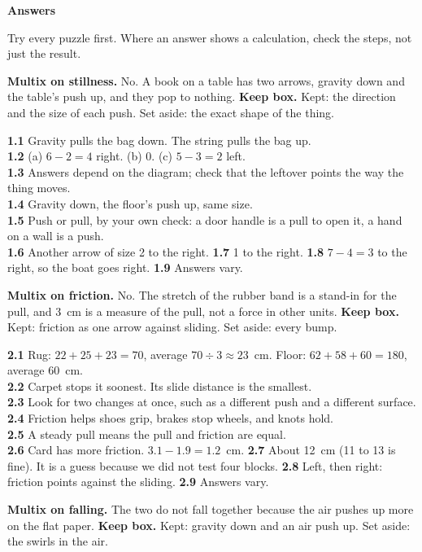 \clearpage\label{answers}
{\sans\bfseries\LARGE\color{ink} Answers}\par
\footnotesize
Try every puzzle first. Where an answer shows a calculation, check the steps, not just the result.

\textbf{Multix on stillness.} No. A book on a table has two arrows, gravity down and the table's push up, and they pop to nothing. \textbf{Keep box.} Kept: the direction and the size of each push. Set aside: the exact shape of the thing.

\textbf{1.1} Gravity pulls the bag down. The string pulls the bag up.\\
\textbf{1.2} (a) $6-2=4$ right. (b) 0. (c) $5-3=2$ left.\\
\textbf{1.3} Answers depend on the diagram; check that the leftover points the way the thing moves.\\
\textbf{1.4} Gravity down, the floor's push up, same size.\\
\textbf{1.5} Push or pull, by your own check: a door handle is a pull to open it, a hand on a wall is a push.\\
\textbf{1.6} Another arrow of size 2 to the right. \textbf{1.7} 1 to the right. \textbf{1.8} $7-4=3$ to the right, so the boat goes right. \textbf{1.9} Answers vary.

\textbf{Multix on friction.} No. The stretch of the rubber band is a stand-in for the pull, and 3~cm is a measure of the pull, not a force in other units. \textbf{Keep box.} Kept: friction as one arrow against sliding. Set aside: every bump.

\textbf{2.1} Rug: $22+25+23=70$, average $70\div3\approx23$~cm. Floor: $62+58+60=180$, average 60~cm.\\
\textbf{2.2} Carpet stops it soonest. Its slide distance is the smallest.\\
\textbf{2.3} Look for two changes at once, such as a different push and a different surface.\\
\textbf{2.4} Friction helps shoes grip, brakes stop wheels, and knots hold.\\
\textbf{2.5} A steady pull means the pull and friction are equal.\\
\textbf{2.6} Card has more friction. $3.1-1.9=1.2$~cm. \textbf{2.7} About 12~cm (11 to 13 is fine). It is a guess because we did not test four blocks. \textbf{2.8} Left, then right: friction points against the sliding. \textbf{2.9} Answers vary.

\textbf{Multix on falling.} The two do not fall together because the air pushes up more on the flat paper. \textbf{Keep box.} Kept: gravity down and an air push up. Set aside: the swirls in the air.

